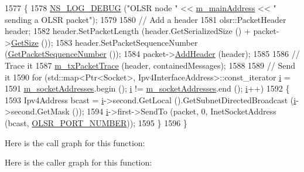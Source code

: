 \begin{DoxyCode}
1577 \{
1578   \hyperlink{group__logging_ga413f1886406d49f59a6a0a89b77b4d0a}{NS\_LOG\_DEBUG} (\textcolor{stringliteral}{"OLSR node "} << \hyperlink{classns3_1_1olsr_1_1RoutingProtocol_a58cc50ed5d1039aab603e90e318aabfb}{m\_mainAddress} << \textcolor{stringliteral}{" sending a OLSR packet"});
1579 
1580   \textcolor{comment}{// Add a header}
1581   olsr::PacketHeader header;
1582   header.SetPacketLength (header.GetSerializedSize () + packet->\hyperlink{classns3_1_1Packet_a462855c9929954d4301a4edfe55f4f1c}{GetSize} ());
1583   header.SetPacketSequenceNumber (\hyperlink{classns3_1_1olsr_1_1RoutingProtocol_ab7cac75ba09d451d4cc12acb2030fbee}{GetPacketSequenceNumber} ());
1584   packet->\hyperlink{classns3_1_1Packet_a465108c595a0bc592095cbcab1832ed8}{AddHeader} (header);
1585 
1586   \textcolor{comment}{// Trace it}
1587   \hyperlink{classns3_1_1olsr_1_1RoutingProtocol_aadd8d4fea9a32b185bf23d787004de9d}{m\_txPacketTrace} (header, containedMessages);
1588 
1589   \textcolor{comment}{// Send it}
1590   \textcolor{keywordflow}{for} (std::map<Ptr<Socket>, Ipv4InterfaceAddress>::const\_iterator \hyperlink{bernuolliDistribution_8m_a6f6ccfcf58b31cb6412107d9d5281426}{i} =
1591          \hyperlink{classns3_1_1olsr_1_1RoutingProtocol_ae590f1f394f2ebc0fac434a6866d7c75}{m\_socketAddresses}.begin (); \hyperlink{bernuolliDistribution_8m_a6f6ccfcf58b31cb6412107d9d5281426}{i} != \hyperlink{classns3_1_1olsr_1_1RoutingProtocol_ae590f1f394f2ebc0fac434a6866d7c75}{m\_socketAddresses}.end (); 
      \hyperlink{bernuolliDistribution_8m_a6f6ccfcf58b31cb6412107d9d5281426}{i}++)
1592     \{
1593       Ipv4Address bcast = \hyperlink{bernuolliDistribution_8m_a6f6ccfcf58b31cb6412107d9d5281426}{i}->second.GetLocal ().GetSubnetDirectedBroadcast (\hyperlink{bernuolliDistribution_8m_a6f6ccfcf58b31cb6412107d9d5281426}{i}->second.GetMask ());
1594       \hyperlink{bernuolliDistribution_8m_a6f6ccfcf58b31cb6412107d9d5281426}{i}->first->SendTo (packet, 0, InetSocketAddress (bcast, \hyperlink{olsr-routing-protocol_8cc_a56099fb2a14f4a74c5e155c13e9ef8db}{OLSR\_PORT\_NUMBER}));
1595     \}
1596 \}
\end{DoxyCode}


Here is the call graph for this function\+:




Here is the caller graph for this function\+:


